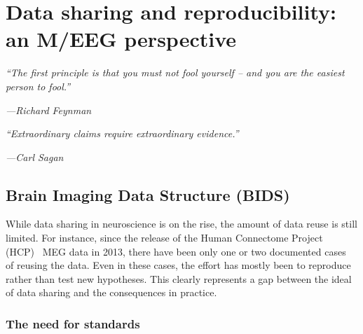 \chapter{Data sharing and reproducibility: an M/EEG perspective}
\label{chapter:group_study}

\epigraph{\small\itshape ``The first principle is that you must not fool yourself – and you are the easiest person to fool.''}{\small\textit{---Richard Feynman}}

\vspace{20pt}
\epigraph{\small\itshape ``Extraordinary claims require extraordinary evidence.''}
{\small\textit{---Carl Sagan}}

\section{Brain Imaging Data Structure (BIDS)}

While data sharing in neuroscience is on the rise, the amount of data reuse is still limited. For instance, since the release of the Human Connectome Project (HCP)~\citep{larson2013adding} MEG data in 2013, there have been only one or two documented cases~\citep{jas2017autoreject} of reusing the data. Even in these cases, the effort has mostly been to reproduce rather than test new hypotheses. This clearly represents a gap between the ideal of data sharing and the consequences in practice. 


\subsection{The need for standards}

